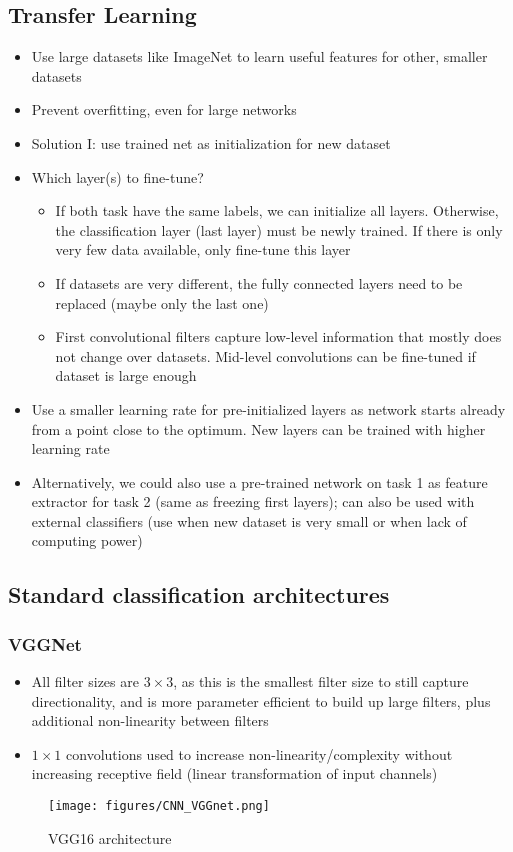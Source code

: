 \subsection{Transfer Learning}
\begin{itemize}
	\item Use large datasets like ImageNet to learn useful features for other, smaller datasets
	\item Prevent overfitting, even for large networks
	\item Solution I: use trained net as initialization for new dataset
	\item Which layer(s) to fine-tune?
	\begin{itemize}
		\item If both task have the same labels, we can initialize all layers. Otherwise, the classification layer (last layer) must be newly trained. If there is only very few data available, only fine-tune this layer
		\item If datasets are very different, the fully connected layers need to be replaced (maybe only the last one)
		\item First convolutional filters capture low-level information that mostly does not change over datasets. Mid-level convolutions can be fine-tuned if dataset is large enough
	\end{itemize}
	\item Use a smaller learning rate for pre-initialized layers as network starts already from a point close to the optimum. New layers can be trained with higher learning rate
	\item Alternatively, we could also use a pre-trained network on task 1 as feature extractor for task 2 (same as freezing first layers); can also be used with external classifiers (use when new dataset is very small or when lack of computing power)
\end{itemize}
\subsection{Standard classification architectures}
\subsubsection{VGGNet}
\begin{itemize}
	\item All filter sizes are $3\times 3$, as this is the smallest filter size to still capture directionality, and is more parameter efficient to build up large filters, plus additional non-linearity between filters
	\item $1\times 1$ convolutions used to increase non-linearity/complexity without increasing receptive field (linear transformation of input channels)
\end{itemize}
\begin{figure}[ht!]
	\centering
	\texttt{[image: figures/CNN\_VGGnet.png]}
	\caption{VGG16 architecture}
	\label{fig:CNN_VVGnet}
\end{figure}
